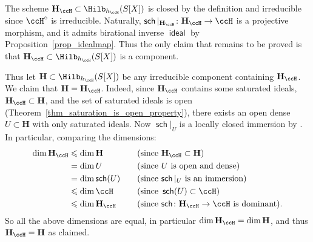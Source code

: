 \documentclass[12pt,a4paper]{article}
\DeclareMathOperator{\sch}{\mathsf {sch}}
\DeclareMathOperator{\idealmap}{\mathsf {ideal}}
\begin{document}
\begin{prf}
    The scheme $\mathbf{H}_{\ccH} \subset \Hilb_{h_{\ccH}}(S[X])$ is closed by the definition and irreducible since $\ccH^{\circ}$ is irreducible.
    Naturally, $\sch|_{\mathbf{H}_{\ccH}} \colon\mathbf{H}_{\ccH} \to \ccH$ is a projective morphism, and it admits birational inverse $\idealmap$ by Proposition~\ref{prop_idealmap}.
    Thus the only claim that remains to be proved is that $\mathbf{H}_{\ccH} \subset \Hilb_{h_{\ccH}}(S[X])$ is a component.


    Thus let $\mathbf{H} \subset \Hilb_{h_{\ccH}}(S[X])$ be any irreducible component containing $\mathbf{H}_{\ccH}$.
    We claim that $\mathbf{H} = \mathbf{H}_{\ccH}$.
    Indeed, since $\mathbf{H}_{\ccH}$ contains some saturated ideals, $\mathbf{H}_{\ccH}\subset \mathbf{H}$, and the set of saturated ideals is open (Theorem~\ref{thm_saturation_is_open_property}), there exists an open dense $U\subset \mathbf{H}$ with only saturated ideals.
    Now $\sch|_U$ is a locally closed immersion by \cite[Cor.~2.8]{jelisiejew_mandziuk_limits_of_saturated_ideals}.
    In particular, comparing the dimensions:
    \begin{alignat*}{2}
      \dim \mathbf{H}_{\ccH} & \leqslant \dim \mathbf{H} & \quad &(\text{since } \mathbf{H}_{\ccH}\subset \mathbf{H})\\
      &= \dim U && (\text{since $U$ is open and dense})\\
      &= \dim \sch(U) && (\text{since $\sch|_U$ is an immersion})\\
      &\leqslant \dim \ccH &&(\text{since } \sch(U)\subset \ccH)\\
      &\leqslant \dim \mathbf{H}_{\ccH} &&
      (\text{since $\sch\colon \mathbf{H}_{\ccH}\to \ccH$ is dominant}).
    \end{alignat*}
    So all the above dimensions are equal,
      in particular $\dim \mathbf{H}_{\ccH} = \dim \mathbf{H}$,
      and thus $\mathbf{H}_{\ccH} = \mathbf{H}$
    as claimed.
\end{prf}
\end{document}
